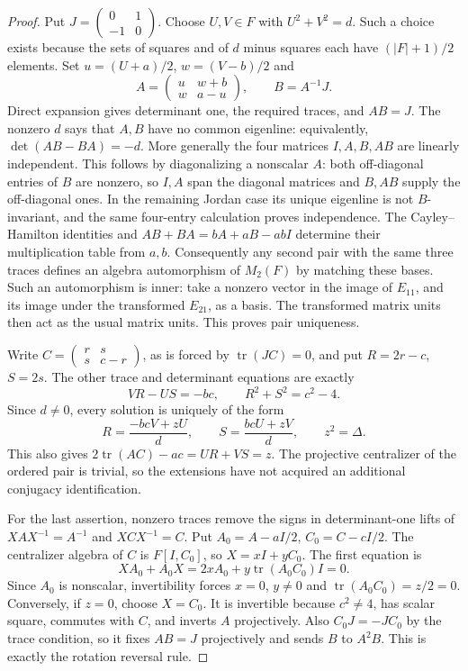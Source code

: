 \begin{proof}
Put $J=\left(\begin{smallmatrix}0&1\\-1&0\end{smallmatrix}\right)$.
Choose $U,V\in F$ with $U^2+V^2=d$. Such a choice exists because the
sets of squares and of $d$ minus squares each have $(|F|+1)/2$ elements.
Set $u=(U+a)/2$, $w=(V-b)/2$ and
\[
 A=\begin{pmatrix}u&w+b\\w&a-u\end{pmatrix},\qquad B=A^{-1}J.
\]
Direct expansion gives determinant one, the required traces, and $AB=J$.
The nonzero $d$ says that $A,B$ have no common eigenline: equivalently,
$\det(AB-BA)=-d$. More generally the four matrices $I,A,B,AB$ are
linearly independent. This follows by diagonalizing a nonscalar $A$:
both off-diagonal entries of $B$ are nonzero, so $I,A$ span the diagonal
matrices and $B,AB$ supply the off-diagonal ones. In the remaining Jordan
case its unique eigenline is not $B$-invariant, and the same four-entry
calculation proves independence.
The Cayley--Hamilton identities and
$AB+BA=bA+aB-abI$ determine their multiplication table from $a,b$.
Consequently any second pair with the same three traces defines an
algebra automorphism of $M_2(F)$ by matching these bases. Such an
automorphism is inner: take a nonzero vector in the image of $E_{11}$,
and its image under the transformed $E_{21}$, as a basis. The transformed
matrix units then act as the usual matrix units. This proves pair uniqueness.

Write $C=\left(\begin{smallmatrix}r&s\\s&c-r\end{smallmatrix}\right)$,
as is forced by $\operatorname{tr}(JC)=0$, and put $R=2r-c$, $S=2s$.
The other trace and determinant equations are exactly
\[
 VR-US=-bc,\qquad R^2+S^2=c^2-4.
\]
Since $d\ne0$, every solution is uniquely of the form
\[
 R=\frac{-bcV+zU}{d},\qquad S=\frac{bcU+zV}{d},\qquad z^2=\Delta.
\]
This also gives $2\operatorname{tr}(AC)-ac=UR+VS=z$.
The projective centralizer of the ordered pair is trivial, so the
extensions have not acquired an additional conjugacy identification.

For the last assertion, nonzero traces remove the signs in determinant-one
lifts of $XAX^{-1}=A^{-1}$ and $XCX^{-1}=C$.
Put $A_0=A-aI/2$, $C_0=C-cI/2$. The centralizer algebra of $C$ is
$F[I,C_0]$, so $X=xI+yC_0$. The first equation is
\[
 XA_0+A_0X=2xA_0+y\operatorname{tr}(A_0C_0)I=0.
\]
Since $A_0$ is nonscalar, invertibility forces $x=0$, $y\ne0$ and
$\operatorname{tr}(A_0C_0)=z/2=0$. Conversely, if $z=0$, choose $X=C_0$.
It is invertible because $c^2\ne4$, has scalar square, commutes with $C$,
and inverts $A$ projectively. Also $C_0J=-JC_0$ by the trace condition,
so it fixes $AB=J$ projectively and sends $B$ to $A^2B$.
This is exactly the rotation reversal rule.
\end{proof}

